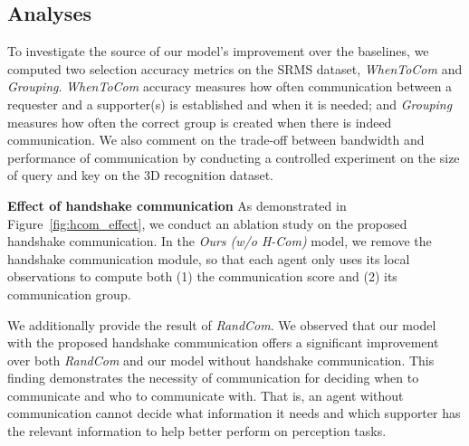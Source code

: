 \subsection{Analyses}

To investigate the source of our model's improvement over the baselines, we computed two selection accuracy metrics on the SRMS dataset, \textit{WhenToCom} and \textit{Grouping}. \textit{WhenToCom} accuracy measures how often communication between a requester and a supporter(s) is established and when it is needed; and \textit{Grouping} measures how often the correct group is created when there is indeed communication. We also comment on the trade-off between bandwidth and performance of communication by conducting a controlled experiment on the size of query and key on the 3D recognition dataset. 

\noindent
\textbf{Effect of handshake communication}
As demonstrated in Figure~\ref{fig:hcom_effect}, we conduct an ablation study on the proposed handshake communication. In the \textit{Ours (w/o H-Com)} model, we remove the handshake communication module, so that each agent only uses its local observations to compute both (1) the communication score and (2) its communication group.

We additionally provide the result of \textit{RandCom}.  We observed that our model with the proposed handshake communication offers a significant improvement over both \textit{RandCom} and our model without handshake communication. This finding demonstrates the necessity of communication for deciding when to communicate and who to communicate with. That is, an agent without communication cannot decide what information it needs and which supporter has the relevant information to help better perform on perception tasks.

